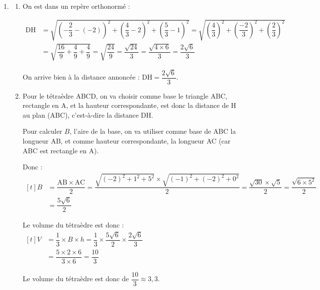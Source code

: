 \documentclass[10pt]{article}
\begin{document}
\begin{enumerate}
On reconnaît les coordonnées du point H. H est donc l'intersection de $\Delta$ et (ABC), c'est donc l'intersection du plan (ABC) avec la droite passant par D et orthogonale à (ABC) : H est le projeté orthogonal de D sur (ABC).

	\item 
		\begin{enumerate}
		\item On est dans un repère orthonormé :

$\begin{aligned}
	\mathrm{DH} &= \sqrt{\left(-\dfrac{2}{3} - (-2)\right)^2+\left(\dfrac{4}{3} - 2\right)^2+\left(\dfrac{5}{3} - 1\right)^2 } = \sqrt{\left(\dfrac{4}{3}\right)^2+\left(\dfrac{-2}{3}\right)^2+\left(\dfrac{2}{3}\right)^2 } \\
	&= \sqrt{\dfrac{16}{9} + \dfrac{4}{9} + \dfrac{4}{9}} = \sqrt{\dfrac{24}{9}} = \dfrac{\sqrt{24}}{3} = \dfrac{\sqrt{4\times 6}}{3} = \dfrac{2\sqrt{6}}{3}
\end{aligned}$

		On arrive bien à la distance annoncée : \quad $\mathrm{DH} = \dfrac{2\sqrt{6}}{3}$.

		\item Pour le tétraèdre ABCD, on va choisir comme base le triangle ABC, rectangle en A, et la hauteur correspondante, est donc la distance de H au plan (ABC), c'est-à-dire la distance DH.

		Pour calculer $B$, l'aire de la base, on va utiliser comme base de ABC la longueur AB, et comme hauteur correspondante, la longueur AC (car ABC est rectangle en A).

		Donc :\quad $\begin{aligned}[t]
			B &= \dfrac{\mathrm{AB} \times \mathrm{AC}}{2} = \dfrac{\sqrt{(-2)^2 + 1^2 + 5^2}\times \sqrt{(-1)^2 + (-2)^2 + 0^2}}{2} = \dfrac{\sqrt{30}\times \sqrt{5}}{2}= \dfrac{\sqrt{6\times5^2}}{2}\\
			&=\dfrac{5\sqrt{6}}{2}
		\end{aligned}$

		Le volume du tétraèdre est donc :\quad $\begin{aligned}[t]
			V &= \dfrac{1}{3}\times B \times h = \dfrac{1}{3} \times \dfrac{5\sqrt{6}}{2}\times \dfrac{2\sqrt{6}}{3} \\
			&= \dfrac{5\times2\times6}{3\times6} = \dfrac{10}{3}
		\end{aligned}$

		Le volume du tétraèdre est donc de $\dfrac{10}{3} \approx 3,3$.
		\end{enumerate}


\end{enumerate}
\end{document}
